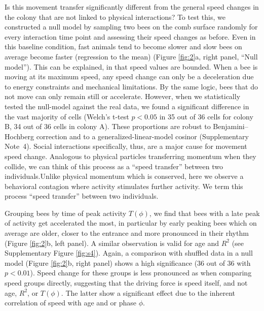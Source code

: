 \documentclass{article}
\newcommand{\added}[1]{{\color{blue}#1}}
\newcommand{\deleted}[1]{{\color{red}#1}} %
\newcommand{\replaced}[2]{\deleted{#1}\added{#2}}
\newcommand{\added}[1]{#1}
\newcommand{\deleted}[1]{}
\newcommand{\replaced}[2]{#2}
\begin{document}
Is this movement transfer significantly different from the general speed changes in the colony that are not linked to physical interactions? To test this, we constructed a null model by sampling two bees on the comb surface randomly for every interaction time point and assessing their speed changes as before. Even in this baseline condition, fast animals tend to become slower and slow bees on average become faster \added{(regression to the mean)} (Figure \ref{fig:2}a, right panel, “Null model”). This can be explained, in that speed values are bounded. When a bee is moving at its maximum speed, any speed change can only be a deceleration due to energy constraints and mechanical limitations. By the same logic, bees that do not move can only remain still or accelerate. However, when we statistically tested the null-model against the real data, we found a significant difference in the vast majority of cells (Welch’s t-test $p < 0.05$ in 35 out of 36 cells for colony B, 34 out of 36 cells in colony A). \added{These proportions are robust to Benjamini--Hochberg correction and to a generalized-linear-model cosinor (Supplementary Note~4).} Social interactions specifically, thus, are a major cause for movement speed change. \replaced{Analogous to physical particles transferring momentum when they collide, we can think of this process as a “speed transfer” between two individuals.}{Unlike physical momentum which is conserved, here we observe a behavioral contagion where activity stimulates further activity. We term this process “speed transfer” between two individuals.} 

Grouping bees by time of peak activity $T(\phi)$, we find that bees with a late peak of activity get accelerated the most, in particular by early peaking bees which on average are older, closer to the entrance and more pronounced in their rhythm (Figure \ref{fig:2}b, left panel). A similar observation is valid for age and $R^2$ (see Supplementary Figure \ref{fig:s4}). Again, a comparison with shuffled data in a null model (Figure \ref{fig:2}b, right panel) shows a high significance (36 out of 36 with $p < 0.01$). Speed change for these groups is less pronounced as when comparing speed groups directly, suggesting that the driving force is speed itself, and not age, $R^2$, or $T(\phi)$. The latter show a significant effect due to the inherent correlation of speed with age and or phase $\phi$.
\end{document}
